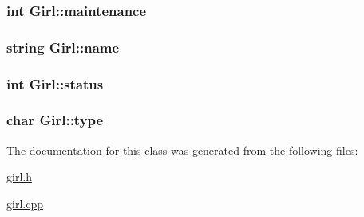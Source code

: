 \subsubsection[{\texorpdfstring{maintenance}{maintenance}}]{\setlength{\rightskip}{0pt plus 5cm}int Girl\+::maintenance\hspace{0.3cm}{\ttfamily [private]}}\hypertarget{classGirl_a118d70c1341fd634eb2b050b7435fa7d}{}\label{classGirl_a118d70c1341fd634eb2b050b7435fa7d}
\subsubsection[{\texorpdfstring{name}{name}}]{\setlength{\rightskip}{0pt plus 5cm}string Girl\+::name\hspace{0.3cm}{\ttfamily [private]}}\hypertarget{classGirl_ace47c55f2f3bc3237f6acba40302b442}{}\label{classGirl_ace47c55f2f3bc3237f6acba40302b442}
\subsubsection[{\texorpdfstring{status}{status}}]{\setlength{\rightskip}{0pt plus 5cm}int Girl\+::status\hspace{0.3cm}{\ttfamily [private]}}\hypertarget{classGirl_a0d710846b78083cb192a47527ade8e54}{}\label{classGirl_a0d710846b78083cb192a47527ade8e54}
\subsubsection[{\texorpdfstring{type}{type}}]{\setlength{\rightskip}{0pt plus 5cm}char Girl\+::type\hspace{0.3cm}{\ttfamily [private]}}\hypertarget{classGirl_a665ddab81c819c4555d5aa50f44f5bb1}{}\label{classGirl_a665ddab81c819c4555d5aa50f44f5bb1}


The documentation for this class was generated from the following files\+:\begin{DoxyCompactItemize}
\item 
\hyperlink{girl_8h}{girl.\+h}\item 
\hyperlink{girl_8cpp}{girl.\+cpp}\end{DoxyCompactItemize}
